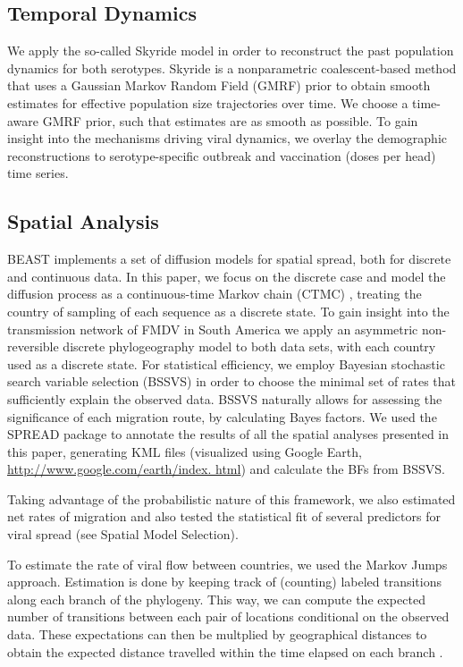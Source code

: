 \documentclass[10pt]{article}
\begin{document}
\subsection*{Temporal Dynamics}

We apply the so-called Skyride model \cite{skyride} in order to reconstruct the past population dynamics for both serotypes. Skyride is a nonparametric coalescent-based method that uses a Gaussian Markov Random Field (GMRF) prior to obtain smooth estimates for effective population size trajectories over time. We choose a time-aware GMRF prior, such that estimates are as smooth as possible.
To gain insight into the mechanisms driving viral dynamics, we overlay the demographic reconstructions to serotype-specific outbreak and vaccination (doses per head) time series.

\subsection*{Spatial Analysis}

BEAST \cite{BEAST} implements a set of diffusion models for spatial spread, both for discrete and continuous data.
In this paper, we focus on the discrete case and model the diffusion process as a continuous-time Markov chain (CTMC) \cite{roots}, treating the country of sampling of each sequence as a discrete state.
To gain insight into the transmission network of FMDV in South America we apply an asymmetric non-reversible discrete phylogeography model to both data sets, with each country used as a discrete state.
For statistical efficiency, we employ Bayesian stochastic search variable selection (BSSVS) in order to choose the minimal set of rates that sufficiently explain the observed data.
BSSVS naturally allows for assessing the significance of each migration route, by calculating Bayes factors.
We used the SPREAD \cite{spread} package to annotate the results of all the spatial analyses presented in this paper, generating KML files (visualized using Google Earth, \url{http://www.google.com/earth/index.
html}) and calculate the BFs from BSSVS.

Taking advantage of the probabilistic nature of this framework, we also estimated net rates of migration and also tested the statistical fit of several predictors for viral spread (see Spatial Model Selection).

To estimate the rate of viral flow between countries, we used the Markov Jumps \cite{Minin2008} approach.
Estimation is done by keeping track of (counting) labeled transitions along each branch of the phylogeny.
This way, we can compute the expected number of transitions between each pair of locations conditional on the observed data.
These expectations can then be multplied by geographical distances to obtain the expected distance travelled within the time elapsed on each branch \cite{zoonotic}.
\end{document}
